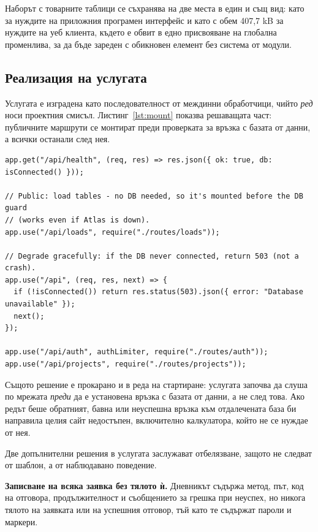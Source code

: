 Наборът с товарните таблици се съхранява на две места в един и същ вид: като
 за нуждите на приложния програмен интерфейс и като
 с обем 407{,}7 kB за нуждите на уеб клиента, където е обвит в
едно присвояване на глобална променлива, за да бъде зареден с обикновен елемент
 без система от модули.

\subsection{Реализация на услугата}
\label{subsec:server}

Услугата е изградена като последователност от междинни обработчици, чийто \emph{ред}
носи проектния смисъл. Листинг~\ref{lst:mount} показва решаващата част: публичните
маршрути се монтират преди проверката за връзка с базата от данни, а всички
останали след нея.
\newpage
\begin{lstlisting}[caption={Ред на монтиране: публичните маршрути преживяват отказ на базата},label={lst:mount}]
app.get("/api/health", (req, res) => res.json({ ok: true, db: isConnected() }));

// Public: load tables - no DB needed, so it's mounted before the DB guard
// (works even if Atlas is down).
app.use("/api/loads", require("./routes/loads"));

// Degrade gracefully: if the DB never connected, return 503 (not a crash).
app.use("/api", (req, res, next) => {
  if (!isConnected()) return res.status(503).json({ error: "Database unavailable" });
  next();
});

app.use("/api/auth", authLimiter, require("./routes/auth"));
app.use("/api/projects", require("./routes/projects"));
\end{lstlisting}

Същото решение е прокарано и в реда на стартиране: услугата започва да слуша по
мрежата \emph{преди} да е установена връзка с базата от данни, а не след това. Ако
редът беше обратният, бавна или неуспешна връзка към отдалечената база би направила
целия сайт недостъпен, включително калкулатора, който не се нуждае от нея.

Две допълнителни решения в услугата заслужават отбелязване, защото не следват от
шаблон, а от наблюдавано поведение.

\textbf{Записване на всяка заявка без тялото ѝ.} Дневникът съдържа метод, път, код на
отговора, продължителност и съобщението за грешка при неуспех, но никога тялото на
заявката или на успешния отговор, тъй като те съдържат пароли и маркери.

